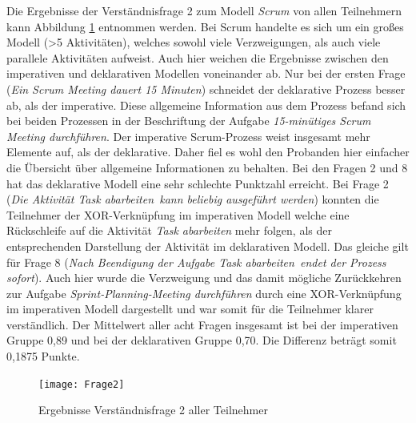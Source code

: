 Die Ergebnisse der Verständnisfrage 2 zum Modell \textit{Scrum} von allen Teilnehmern kann Abbildung \ref{fig:Frage2} entnommen werden.  Bei Scrum handelte es sich um ein großes Modell (>5 Aktivitäten), welches sowohl viele Verzweigungen, als auch viele parallele Aktivitäten aufweist. Auch hier weichen die Ergebnisse zwischen den imperativen und deklarativen Modellen voneinander ab.\newline
Nur bei der ersten Frage (\textit{Ein Scrum Meeting dauert 15 Minuten}) schneidet der deklarative Prozess besser ab, als der imperative. Diese allgemeine Information aus dem Prozess befand sich bei beiden Prozessen in der Beschriftung der Aufgabe \textit{15-minütiges Scrum Meeting durchführen}. Der imperative Scrum-Prozess weist insgesamt mehr Elemente auf, als der deklarative. Daher fiel es wohl den Probanden hier einfacher die Übersicht über allgemeine Informationen zu behalten.\newline
Bei den Fragen 2 und 8 hat das deklarative Modell eine sehr schlechte Punktzahl erreicht. Bei Frage 2 (\textit{Die Aktivität \grqq Task abarbeiten\grqq \ kann beliebig ausgeführt werden}) konnten die Teilnehmer der XOR-Verknüpfung im imperativen Modell welche eine Rückschleife auf die Aktivität \textit{Task abarbeiten} mehr folgen, als der entsprechenden Darstellung der Aktivität im deklarativen Modell. \newline
Das gleiche gilt für Frage 8 (\textit{Nach Beendigung der Aufgabe \grqq Task abarbeiten\grqq \ endet der Prozess sofort}). Auch hier wurde die Verzweigung und das damit mögliche Zurückkehren zur Aufgabe \textit{Sprint-Planning-Meeting durchführen} durch eine XOR-Verknüpfung im imperativen Modell dargestellt und war somit für die Teilnehmer klarer verständlich.\newline
Der Mittelwert aller acht Fragen insgesamt ist bei der imperativen Gruppe 0,89 und bei der deklarativen Gruppe 0,70. Die Differenz beträgt somit 0,1875 Punkte.\newline


\begin{figure}[htp]
\begin{center}
  \texttt{[image: Frage2]} %
  \caption{Ergebnisse Verständnisfrage 2 aller Teilnehmer}
  \label{fig:Frage2}
\end{center}
\end{figure}

